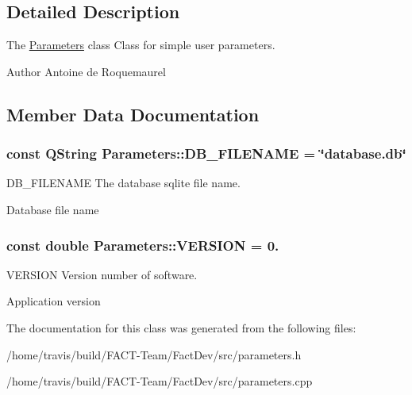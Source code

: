 \subsection{Detailed Description}
The \hyperlink{classParameters}{Parameters} class Class for simple user parameters. 

\begin{DoxyAuthor}{Author}
Antoine de Roquemaurel 
\end{DoxyAuthor}


\subsection{Member Data Documentation}
\hypertarget{classParameters_a80b98bd51d910bcc2203afcacbc7df87}{
\subsubsection[{D\-B\-\_\-\-F\-I\-L\-E\-N\-A\-M\-E}]{\setlength{\rightskip}{0pt plus 5cm}const Q\-String Parameters\-::\-D\-B\-\_\-\-F\-I\-L\-E\-N\-A\-M\-E = \char`\"{}database.\-db\char`\"{}\hspace{0.3cm}{\ttfamily [static]}}}\label{classParameters_a80b98bd51d910bcc2203afcacbc7df87}


D\-B\-\_\-\-F\-I\-L\-E\-N\-A\-M\-E The database sqlite file name. 

Database file name \hypertarget{classParameters_a279ee24140c761de46178daa8960bdc8}{
\subsubsection[{V\-E\-R\-S\-I\-O\-N}]{\setlength{\rightskip}{0pt plus 5cm}const double Parameters\-::\-V\-E\-R\-S\-I\-O\-N = 0.\hspace{0.3cm}{\ttfamily [static]}}}\label{classParameters_a279ee24140c761de46178daa8960bdc8}


V\-E\-R\-S\-I\-O\-N Version number of software. 

Application version 

The documentation for this class was generated from the following files\-:\begin{DoxyCompactItemize}
\item 
/home/travis/build/\-F\-A\-C\-T-\/\-Team/\-Fact\-Dev/src/parameters.\-h\item 
/home/travis/build/\-F\-A\-C\-T-\/\-Team/\-Fact\-Dev/src/parameters.\-cpp\end{DoxyCompactItemize}
